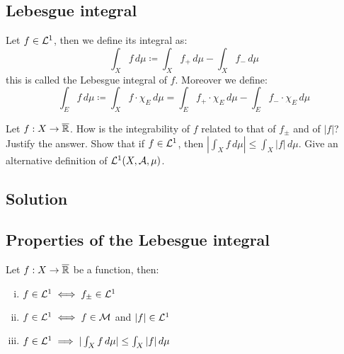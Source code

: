 \subsection{Lebesgue integral}
Let $f\in\mathcal{L}^1$, then we define its integral as:
\[
    \int_X f \, d\mu \coloneqq \int_X f_+ \, d\mu - \int_X f_- \, d\mu
\]
this is called the Lebesgue integral of $f$. Moreover we define:
\[
    \int_E f \, d\mu \coloneqq \int_X f\cdot \chi_E \, d\mu = \int_E f_+\cdot \chi_E \, d\mu - \int_E f_-\cdot \chi_E \, d\mu
\]


\question
Let $f : X \to \overline{\mathbb{R}}$. How is the integrability of $f$  related to that of $f_\pm$ and of $|f|$? Justify the answer. Show that if $f \in \mathcal{L}^1$, then $|\int_X f \, d\mu | \leq \int_X |f| \, d\mu$. Give an alternative definition of $\mathcal{L}^1 (X, \mathcal{A}, \mu)$.

\subsection*{Solution}

\subsection{Properties of the Lebesgue integral}
Let $f:X\to\overline{\mathbb{R}}$ be a function, then: 
\begin{enumerate}[i)]
    \item $f\in\mathcal{L}^1 \iff f_\pm \in \mathcal{L}^1$
    \item $f\in\mathcal{L}^1 \iff f \in \mathcal{M}$ and $|f|\in\mathcal{L}^1$
    \item $f\in\mathcal{L}^1 \implies |\int_X f \, d\mu| \leq \int_X |f| \, d\mu$
\end{enumerate}

